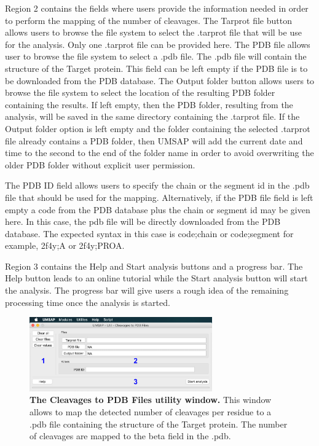 Region \num{2} contains the fields where users provide the information needed in order to perform the mapping of the number of cleavages. The Tarprot file button allows users to browse the file system to select the .tarprot file that will be use for the analysis. Only one .tarprot file can be provided here. The PDB file allows user to browse the file system to select a .pdb file. The .pdb file will contain the structure of the Target protein. This field can be left empty if the PDB file is to be downloaded from the PDB database. The Output folder button allows users to browse the file system to select the location of the resulting PDB folder containing the results. If left empty, then the PDB folder, resulting from the analysis, will be saved in the same directory containing the .tarprot file. If the Output folder option is left empty and the folder containing the selected .tarprot file already contains a PDB folder, then UMSAP will add the current date and time to the second to the end of the folder name in order to avoid overwriting the older PDB folder without explicit user permission.

The PDB ID field allows users to specify the chain or the segment id in the .pdb file that should be used for the mapping. Alternatively, if the PDB file field is left empty a code from the PDB database plus the chain or segment id may be given here. In this case, the pdb file will be directly downloaded from the PDB database. The expected syntax in this case is code;chain or code;segment for example, 2f4y;A or 2f4y;PROA.  

Region \num{3} contains the Help and Start analysis buttons and a progress bar. The Help button leads to an online tutorial while the Start analysis button will start the analysis. The progress bar will give users a rough idea of the remaining processing time once the analysis is started.

\begin{figure}[h]
	\centering
	\includegraphics[width=0.7\textwidth]{./IMAGES/UTIL-PDB-WINDOW/util-pdb.jpg}	    
	\caption[The Cleavages to PDB Files utility window]{\textbf{The Cleavages to PDB Files utility window.} This window allows to map the detected number of cleavages per residue to a .pdb file containing the structure of the Target protein. The number of cleavages are mapped to the beta field in the .pdb.} 
	\label{fig:utilCut2PDB}
	\vspace{-5pt} 	
\end{figure}

